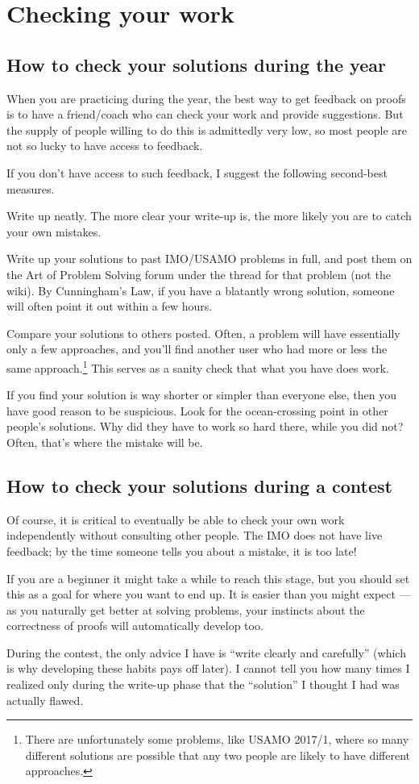 \documentclass[11pt]{scrartcl}
\begin{document}
\section{Checking your work}
\subsection{How to check your solutions during the year}
When you are practicing during the year,
the best way to get feedback on proofs is to have a friend/coach
who can check your work and provide suggestions.
But the supply of people willing to do this is admittedly very low,
so most people are not so lucky to have access to feedback.

If you don't have access to such feedback,
I suggest the following second-best measures.
\begin{itemize}
  \ii Write up neatly.
  The more clear your write-up is,
  the more likely you are to catch your own mistakes.

  \ii Write up your solutions to past IMO/USAMO problems in full,
  and post them on the Art of Problem Solving forum
  under the thread for that problem (not the wiki).
  By Cunningham's Law, if you have a blatantly wrong solution,
  someone will often point it out within a few hours.

  \ii Compare your solutions to others posted.
  Often, a problem will have essentially only a few approaches,
  and you'll find another user who had more or less
  the same approach.\footnote{There are unfortunately some problems,
    like USAMO 2017/1,
    where so many different solutions are possible
    that any two people are likely to have different approaches.}
  This serves as a sanity check that what you have does work.

  If you find your solution is way shorter or simpler
  than everyone else, then you have good reason to be suspicious.
  Look for the ocean-crossing point in other people's solutions.
  Why did they have to work so hard there, while you did not?
  Often, that's where the mistake will be.
\end{itemize}

\subsection{How to check your solutions during a contest}
Of course, it is critical to eventually
be able to check your own work independently
without consulting other people.
The IMO does not have live feedback;
by the time someone tells you about a mistake, it is too late!

If you are a beginner it might take a while to reach this stage,
but you should set this as a goal for where you want to end up.
It is easier than you might expect ---
as you naturally get better at solving problems, your instincts
about the correctness of proofs will automatically develop too.

During the contest, the only advice I have is
``write clearly and carefully''
(which is why developing these habits pays off later).
I cannot tell you how many times I realized only during the write-up phase
that the ``solution'' I thought I had was actually flawed.
\end{document}
